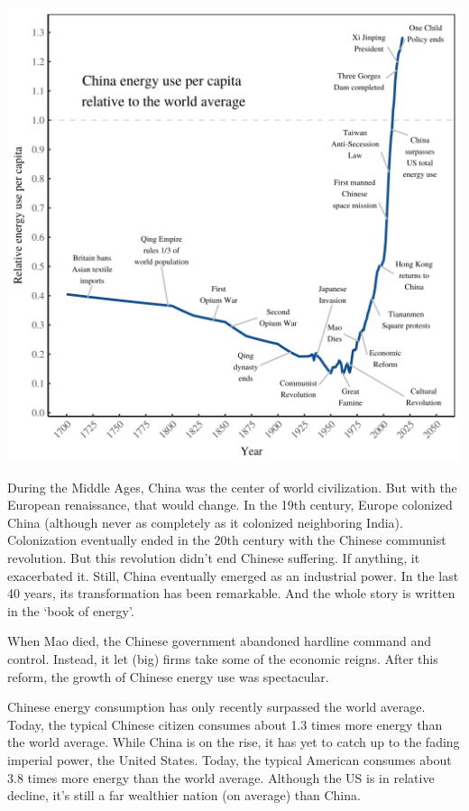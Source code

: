 \documentclass[
]{book}
\begin{document}
\includegraphics{fig/china_energy_pc.png}

During the Middle Ages, China was the center of world civilization. But with the European renaissance, that would change. In the 19th century, Europe colonized China (although never as completely as it colonized neighboring India). Colonization eventually ended in the 20th century with the Chinese communist revolution. But this revolution didn't end Chinese suffering. If anything, it exacerbated it. Still, China eventually emerged as an industrial power. In the last 40 years, its transformation has been remarkable. And the whole story is written in the `book of energy'.

When Mao died, the Chinese government abandoned hardline command and control.
Instead, it let (big) firms take some of the economic reigns.
After this reform, the growth of Chinese energy use was spectacular.

Chinese energy consumption has only recently surpassed the world average. Today, the typical Chinese citizen consumes about 1.3 times more energy than the world average. While China is on the rise, it has yet to catch up to the fading imperial power, the United States. Today, the typical American consumes about 3.8 times more energy than the world average. Although the US is in relative decline, it's still a far wealthier nation (on average) than China.
\end{document}
